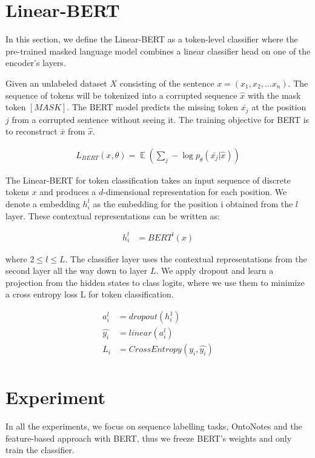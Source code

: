 \documentclass[11pt,a4paper]{article}
\DeclareMathOperator{\EX}{\mathbb{E}}%
\begin{document}
\section{Linear-BERT}


In this section, we define the Linear-BERT as a token-level classifier where the pre-trained masked language model combines a linear classifier head on one of the encoder's layers.

Given an unlabeled dataset $X$ consisting of the sentence $x = (x_{1}, x_{2}, ...{x_n})$. The sequence of tokens will be tokenized into a corrupted sequence $\hat{x}$ with the mask token ${[MASK]}$. The BERT model predicts the missing token $\bar{x_{j}}$ at the position $j$ from a corrupted sentence without seeing it. The training objective for BERT is to reconstruct $\bar{x}$ from $\hat{x}$.

\begin{align*}
    L_{BERT}(x, \theta) = \EX(\sum_{j} - \log p_{\theta}(\bar{x_{j}}| \hat{x}))
\end{align*}


The Linear-BERT for token classification takes an input sequence of discrete tokens ${x}$ and produces a $d$-dimensional representation for each position. We denote a embedding $h_{i}^{l}$ as the embedding for the position {i} obtained from the $l$ layer. These contextual representations can be written as:

\begin{align*}
    h_{i}^{l} &= BERT^{l}(x) 
\end{align*}

where $2 \leq l \leq L$. The classifier layer uses the contextual representations from the second layer all the way down to layer $L$. We apply dropout and learn a projection from the hidden states to class logits, where we use them to minimize a cross entropy loss L for token classification.


\begin{align*}
    a_{i}^{l} &=  dropout(h_{i}^{1}) \\
    \hat{y_{i}} &= linear(a_{i}^{l}) \\
    L_{i} &= CrossEntropy(y_{i}, \hat{y_{i}}) \\
\end{align*}


\section{Experiment}

In all the experiments, we focus on sequence labelling tasks, OntoNotes and the feature-based approach with BERT, thus we freeze BERT's weights and only train the classifier.
\end{document}
